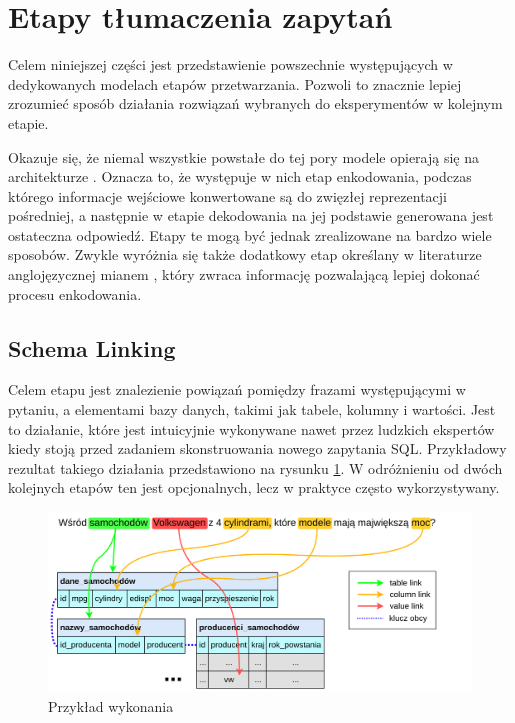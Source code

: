 \section{Etapy tłumaczenia zapytań} \label{specific-stages}
Celem niniejszej części jest przedstawienie powszechnie występujących w dedykowanych modelach  etapów przetwarzania. Pozwoli to znacznie lepiej zrozumieć sposób działania rozwiązań wybranych do eksperymentów w kolejnym etapie.

Okazuje się, że niemal wszystkie powstałe do tej pory modele opierają się na architekturze . Oznacza to, że występuje w nich etap enkodowania, podczas którego informacje wejściowe konwertowane są do zwięzłej reprezentacji pośredniej, a następnie w etapie dekodowania na jej podstawie generowana jest ostateczna odpowiedź. Etapy te mogą być jednak zrealizowane na bardzo wiele sposobów. Zwykle wyróżnia się także dodatkowy etap określany w literaturze anglojęzycznej mianem , który zwraca informację pozwalającą lepiej dokonać procesu enkodowania. 

\subsection{Schema Linking}
Celem etapu  jest znalezienie powiązań pomiędzy frazami występującymi w pytaniu, a elementami bazy danych, takimi jak tabele, kolumny i wartości. Jest to działanie, które jest intuicyjnie wykonywane nawet przez ludzkich ekspertów kiedy stoją przed zadaniem skonstruowania nowego zapytania SQL. Przykładowy rezultat takiego działania przedstawiono na rysunku \ref{fig:schema-linking}. W odróżnieniu od dwóch kolejnych etapów ten jest opcjonalnych, lecz w praktyce często wykorzystywany.

\begin{figure}[ht!]
  \centering
  \includegraphics[width=0.8\linewidth]{images/schema_linking.png}
  \caption{Przykład wykonania }
  \label{fig:schema-linking}
\end{figure}

